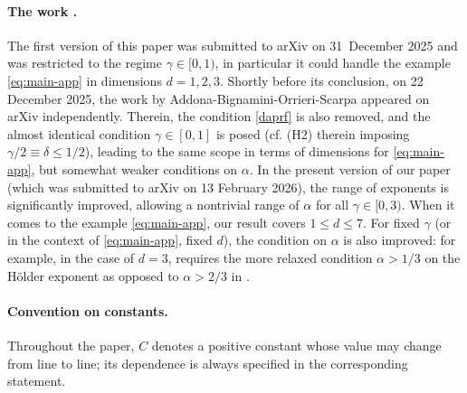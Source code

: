 \documentclass[11pt,a4paper]{article}
\numberwithin{equation}{section}
\let\cref\crtcref
\theoremstyle{definition}
\theoremstyle{remark}
\theoremstyle{plain}
\begin{document}
\paragraph{The work \cite{AddonaBignamini2025}.} The first version of this paper was submitted to arXiv on 31~December 2025 and was restricted to the regime $\gamma\in[0,1)$, in particular it could handle the example \eqref{eq:main-app} in dimensions $d=1,2,3$. Shortly before its conclusion, on 22 December 2025, the work \cite{AddonaBignamini2025} by Addona-Bignamini-Orrieri-Scarpa appeared on arXiv independently. Therein, the condition \eqref{daprf} is also removed, and the almost identical condition $\gamma\in[0,1]$ is posed (cf. (H2) therein imposing  $\gamma/2\equiv\delta\leqslant1/2$), leading to the same scope in terms of dimensions for \eqref{eq:main-app}, but somewhat weaker conditions on $\alpha$. %
In the present version of our paper (which was submitted to arXiv on 13 February 2026), the range of exponents is significantly improved, allowing a nontrivial range of $\alpha$ for all $\gamma\in[0,3)$.
When it comes to the example \eqref{eq:main-app}, 
our result covers $1\leqslant d\leqslant 7$. For fixed $\gamma$ (or in the context of \eqref{eq:main-app}, fixed $d$), the condition on $\alpha$ is also improved: for example, in the case of $d=3$, \cref{cor:maincorollary} requires the more relaxed condition $\alpha>1/3$ on the H\"older exponent as opposed to $\alpha>2/3$ in \cite{AddonaBignamini2025}.



\paragraph{Convention on constants.} Throughout the paper, $C$ denotes a positive constant whose value may change from line to line; its dependence is always specified in the corresponding statement.
\end{document}
